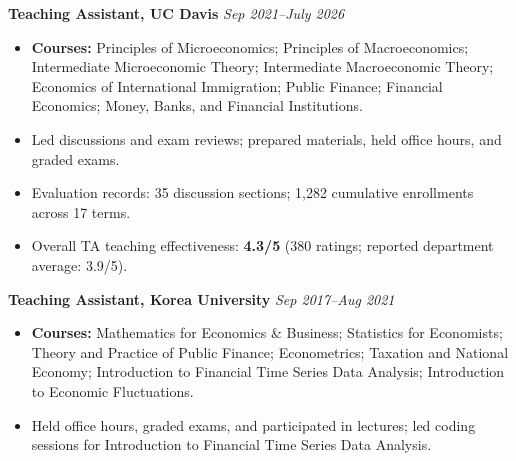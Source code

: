 \documentclass[11pt]{article}
\newcommand{\subentry}[2]{%
  {\small\textbf{#1}} \hfill {\small\textit{#2}}\\
}
\newcommand{\plainitem}[1]{\item #1}
\newenvironment{cvteachinglist}
  {\begin{itemize}[leftmargin=*,topsep=3pt,itemsep=2pt,parsep=0pt,partopsep=0pt]\raggedright}
  {\end{itemize}}
\begin{document}
\subentry{Teaching Assistant, UC Davis}{Sep 2021--July 2026}
\vspace{-1.5em}
\begin{cvteachinglist}
    \plainitem{\textbf{Courses:} Principles of Microeconomics; Principles of Macroeconomics; Intermediate Microeconomic Theory; Intermediate Macroeconomic Theory; Economics of International Immigration; Public Finance; Financial Economics; Money, Banks, and Financial Institutions.}
    \plainitem{Led discussions and exam reviews; prepared materials, held office hours, and graded exams.}
    \plainitem{Evaluation records: 35 discussion sections; 1,282 cumulative enrollments across 17 terms.}
    \plainitem{Overall TA teaching effectiveness: \textbf{4.3/5} (380 ratings; reported department average: 3.9/5).}
\end{cvteachinglist}

\subentry{Teaching Assistant, Korea University}{Sep 2017--Aug 2021}
\vspace{-1.5em}
\begin{cvteachinglist}
    \plainitem{\textbf{Courses:} Mathematics for Economics \& Business; Statistics for Economists; Theory and Practice of Public Finance; Econometrics; Taxation and National Economy; Introduction to Financial Time Series Data Analysis; Introduction to Economic Fluctuations.}
    \plainitem{Held office hours, graded exams, and participated in lectures; led coding sessions for Introduction to Financial Time Series Data Analysis.}
\end{cvteachinglist}
\endgroup
\end{document}
